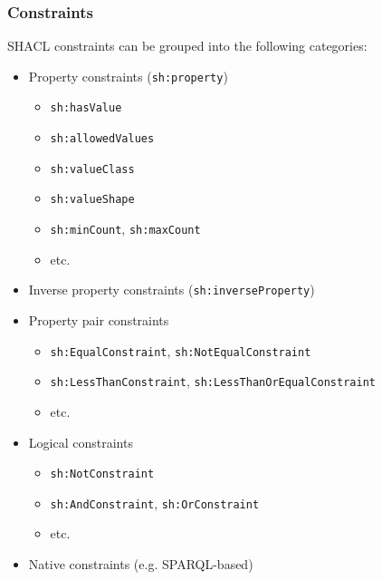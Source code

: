 \documentclass{beamer}
\begin{document}
\begin{frame}
  \frametitle{Constraints}

  SHACL constraints can be grouped into the following categories:

  \pause

  \begin{itemize}
    \item Property constraints (\texttt{sh:property})

    \pause

    \begin{itemize}
      \item \texttt{sh:hasValue}
      \item \texttt{sh:allowedValues}
      \item \texttt{sh:valueClass}
      \item \texttt{sh:valueShape}
      \item \texttt{sh:minCount}, \texttt{sh:maxCount}
      \item etc.
    \end{itemize}

    \pause

    \item Inverse property constraints (\texttt{sh:inverseProperty})

    \pause

    \item Property pair constraints

    \pause

    \begin{itemize}
      \item \texttt{sh:EqualConstraint}, \texttt{sh:NotEqualConstraint}
      \item \texttt{sh:LessThanConstraint},
        \texttt{sh:LessThanOrEqualConstraint}
      \item etc.
    \end{itemize}

    \pause

    \item Logical constraints

    \pause

    \begin{itemize}
      \item \texttt{sh:NotConstraint}
      \item \texttt{sh:AndConstraint}, \texttt{sh:OrConstraint}
      \item etc.
    \end{itemize}

    \pause

    \item Native constraints (e.g. SPARQL-based)
  \end{itemize}
\end{frame}
\end{document}
